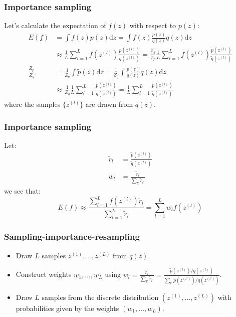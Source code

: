 \documentclass{beamer}
\begin{document}
\begin{frame}
    \frametitle{Importance sampling}
    Let's calculate the expectation of $f(z)$ with respect to $p(z)$:
    \begin{align*}
        E(f)&=\int{}f(z)p(z)\mathrm{d}z=\int{}f(z)\frac{p(z)}{q(z)}q(z)\mathrm{d}z \\
        &\approx\frac{1}{L}\sum_{l=1}^{L}f(z^{(l)})\frac{p(z^{(l)})}{q(z^{(l)})}=\frac{Z_{q}}{Z_{p}}\frac{1}{L}\sum_{l=1}^{L}f(z^{(l)})\frac{\tilde{p}(z^{(l)})}{\tilde{q}(z^{(l)})} \\
        \frac{Z_{p}}{Z_{q}}&=\frac{1}{Z_{q}}\int\tilde{p}(z)\mathrm{d}z=\frac{1}{Z_{q}}\int\frac{\tilde{p}(z)}{q(z)}q(z)\mathrm{d}z \\
        &\approx\frac{1}{Z_{q}}\frac{1}{L}\sum_{l=1}^{L}\frac{\tilde{p}(z^{(l)})}{q(z^{(l)})}=\frac{1}{L}\sum_{l=1}^{L}\frac{\tilde{p}(z^{(l)})}{\tilde{q}(z^{(l)})}
    \end{align*}
    where the samples $\{z^{(l)}\}$ are drawn from $q(z)$.
\end{frame}

\begin{frame}
    \frametitle{Importance sampling}
    Let:
    \begin{align*}
        \tilde{r}_{l}&=\frac{\tilde{p}(z^{(l)})}{\tilde{q}(z^{(l)})} \\
        w_{l}&=\frac{\tilde{r}_{l}}{\sum_{l'}\tilde{r}_{l'}}
    \end{align*}
    we see that:
    \begin{equation*}
        E(f)\approx\frac{\sum_{l=1}^{L}f(z^{(l)})\tilde{r}_{l}}{\sum_{l=1}^{L}\tilde{r}_{l}}=\sum_{l=1}^{L}w_{l}f(z^{(l)})
    \end{equation*}
\end{frame}

\begin{frame}
    \frametitle{Sampling-importance-resampling}
    \begin{itemize}
        \item Draw $L$ samples $z^{(1)},\hdots,z^{(L)}$ from $q(z)$.
        \item Construct weights $w_{1},\hdots,w_{L}$ using $w_{l}=\frac{\tilde{r}_{l}}{\sum_{l'}\tilde{r}_{l'}}=\frac{\tilde{p}(z^{(l)})/q(z^{(l)})}{\sum_{l'}\tilde{p}(z^{(l')})/q(z^{(l')})}$.
        \item Draw $L$ samples from the discrete distribution $(z^{(1)},\hdots,z^{(L)})$ with probabilities given by the weights $(w_{1},\hdots,w_{L})$.
    \end{itemize}
\end{frame}
\end{document}
